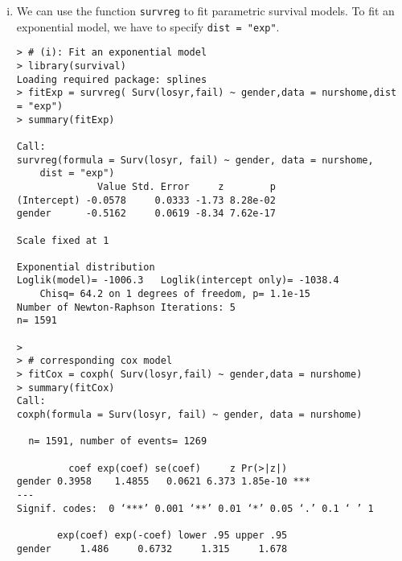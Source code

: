 \begin{enumerate}[(i)]
\item We can use the function \verb|survreg| to fit parametric survival models. To fit an exponential model, we have to specify \verb|dist = "exp"|.
\begin{spacing}{1.2}
\begin{footnotesize}
\begin{verbatim}
> # (i): Fit an exponential model
> library(survival)
Loading required package: splines
> fitExp = survreg( Surv(losyr,fail) ~ gender,data = nurshome,dist = "exp")
> summary(fitExp)

Call:
survreg(formula = Surv(losyr, fail) ~ gender, data = nurshome, 
    dist = "exp")
              Value Std. Error     z        p
(Intercept) -0.0578     0.0333 -1.73 8.28e-02
gender      -0.5162     0.0619 -8.34 7.62e-17

Scale fixed at 1 

Exponential distribution
Loglik(model)= -1006.3   Loglik(intercept only)= -1038.4
	Chisq= 64.2 on 1 degrees of freedom, p= 1.1e-15 
Number of Newton-Raphson Iterations: 5 
n= 1591 

> 
> # corresponding cox model
> fitCox = coxph( Surv(losyr,fail) ~ gender,data = nurshome)
> summary(fitCox)
Call:
coxph(formula = Surv(losyr, fail) ~ gender, data = nurshome)

  n= 1591, number of events= 1269 

         coef exp(coef) se(coef)     z Pr(>|z|)    
gender 0.3958    1.4855   0.0621 6.373 1.85e-10 ***
---
Signif. codes:  0 ‘***’ 0.001 ‘**’ 0.01 ‘*’ 0.05 ‘.’ 0.1 ‘ ’ 1

       exp(coef) exp(-coef) lower .95 upper .95
gender     1.486     0.6732     1.315     1.678


\end{verbatim}
\end{footnotesize}
\end{spacing}
\end{enumerate}

